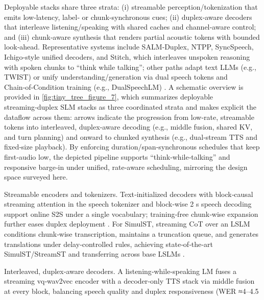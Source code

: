 Deployable stacks share three strata: (i) streamable perception/tokenization that emits low‑latency, label‑ or chunk‑synchronous cues; (ii) duplex‑aware decoders that interleave listening/speaking with shared caches and channel‑aware control; and (iii) chunk‑aware synthesis that renders partial acoustic tokens with bounded look‑ahead. Representative systems include SALM‑Duplex, NTPP, SyncSpeech, Ichigo‑style unified decoders, and Stitch, which interleaves unspoken reasoning with spoken chunks to “think while talking”; other paths adapt text LLMs (e.g., TWIST) or unify understanding/generation via dual speech tokens and Chain‑of‑Condition training (e.g., DualSpeechLM) \cite{chiang2025stitchsimultaneousthinkingtalkingchunked,hassid2024textuallypretrainedspeechlanguagemodels,wang2025dualspeechlmtowardsunifiedspeechundersta}. A schematic overview is provided in \autoref{fig:tiny_tree_figure_7}, which summarizes deployable streaming‑duplex SLM stacks as three coordinated strata and makes explicit the dataflow across them: arrows indicate the progression from low‑rate, streamable tokens into interleaved, duplex‑aware decoding (e.g., middle fusion, shared KV, and turn planning) and onward to chunked synthesis (e.g., dual‑stream TTS and fixed‑size playback). By enforcing duration/span‑synchronous schedules that keep first‑audio low, the depicted pipeline supports “think‑while‑talking” and responsive barge‑in under unified, rate‑aware scheduling, mirroring the design space surveyed here.

Streamable encoders and tokenizers. Text‑initialized decoders with block‑causal streaming attention in the speech tokenizer and block‑wise 2 s speech decoding support online S2S under a single vocabulary; training‑free chunk‑wise expansion further eases duplex deployment \cite{zeng2024scalingspeechtextpretrainingsyntheticint,chang2024dcspinspeakerinvariantspeechtokenizerspo}. For SimulST, streaming CoT over an LSLM conditions chunk‑wise transcription, maintains a truncation queue, and generates translations under delay‑controlled rules, achieving state‑of‑the‑art SimulST/StreamST and transferring across base LSLMs \cite{guo2025streamuniachievingstreamingspeechtransla}.

Interleaved, duplex‑aware decoders. A listening‑while‑speaking LM fuses a streaming vq‑wav2vec encoder with a decoder‑only TTS stack via middle fusion at every block, balancing speech quality and duplex responsiveness (WER ≈4–4.5%

